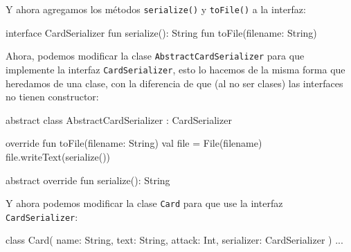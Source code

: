   Y ahora agregamos los métodos \texttt{serialize()} y \texttt{toFile()} a la interfaz:

  \begin{kotlin}
    interface CardSerializer {
      fun serialize(): String
      fun toFile(filename: String)
    }
  \end{kotlin}

  Ahora, podemos modificar la clase \texttt{AbstractCardSerializer} para que implemente la interfaz
  \texttt{CardSerializer}, esto lo hacemos de la misma forma que heredamos de una clase, con la
  diferencia de que (al no ser clases) las interfaces no tienen constructor:

  \begin{kotlin}
    abstract class AbstractCardSerializer : CardSerializer {
      override fun toFile(filename: String) {
        val file = File(filename)
        file.writeText(serialize())
      }

      abstract override fun serialize(): String
    }
  \end{kotlin}

  Y ahora podemos modificar la clase \texttt{Card} para que use la interfaz \texttt{CardSerializer}:

  \begin{kotlin}
    class Card(
      name: String, text: String, attack: Int,
      serializer: CardSerializer
    ) {...}
  \end{kotlin}